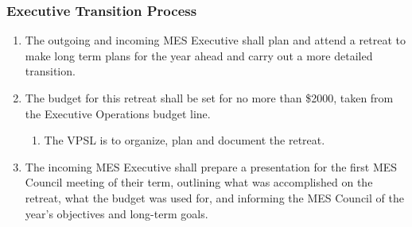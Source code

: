 \subsubsection{Executive Transition Process}
\label{executive-transition-process}
\begin{enumerate}
\item
 The outgoing and incoming MES Executive shall plan and attend a
 retreat to make long term plans for the year ahead and carry out a
 more detailed transition.
\item
 The budget for this retreat shall be set for no more than \$2000,
 taken from the Executive Operations budget line.

 \begin{enumerate}
  \item
   The VPSL is to organize, plan and document the retreat.
 \end{enumerate}
\item
 The incoming MES Executive shall prepare a presentation for the first
 MES Council meeting of their term, outlining what was accomplished on
 the retreat, what the budget was used for, and informing the MES
 Council of the year's objectives and long-term goals.
\end{enumerate}


